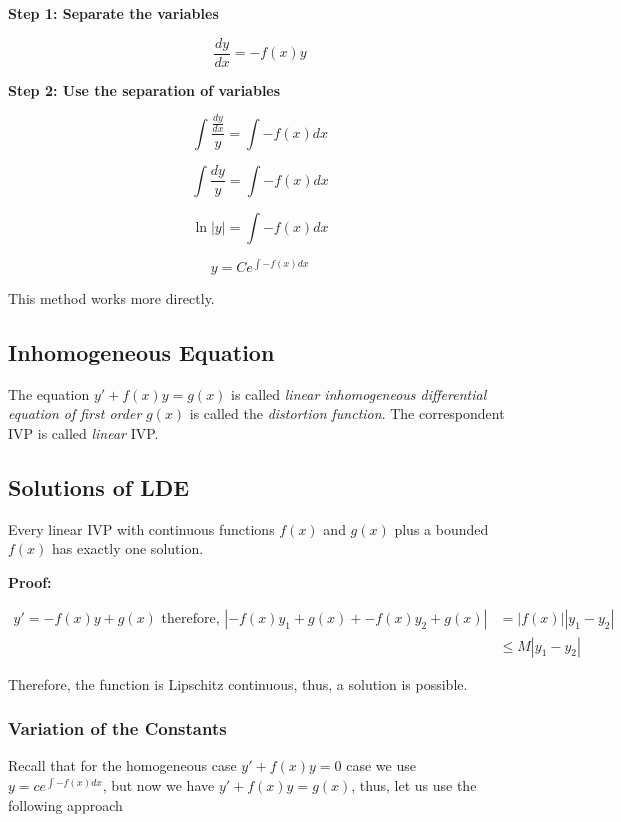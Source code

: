 \textbf{Step 1: Separate the variables}

\[
    \frac{dy}{dx} = -f(x)y
\]

\textbf{Step 2: Use the separation of variables}

\[
    \int \frac{\frac{dy}{dx}}{y} = \int -f(x) dx
\]

\[
    \int \frac{dy}{y} = \int -f(x) dx
\]

\[
    \ln|y| = \int -f(x) dx
\]

\[
    y = C e^{\int -f(x) dx}
\]

This method works more directly.

\subsection{Inhomogeneous Equation}

The equation \(y' + f(x)y = g(x)\) is called \emph{linear inhomogeneous differential equation 
of first order} \(g(x)\) is called the \emph{distortion function}. The correspondent IVP is called
\emph{linear} IVP\@.

\subsection{Solutions of LDE}

Every linear IVP with continuous functions \(f(x)\) and \(g(x)\) plus a bounded \(f(x)\) 
has exactly one solution.
\vspace{\baselineskip}

\textbf{Proof:}

\begin{align*}
    y' = -f(x)y + g(x) \text{ therefore, } |-f(x)y_1 + g(x) + -f(x)y_2 + g(x) | &= |f(x)||y_1 - y_2|\\
                                                                            &\le M |y_1 - y_2|
\end{align*}

Therefore, the function is Lipschitz continuous, thus, a solution is possible.
\QED

\subsubsection{Variation of the Constants}

Recall that for the homogeneous case \(y' + f(x)y = 0\) case we use 
\(y = c e^{\int -f(x) dx}\), but now we have \(y' + f(x)y = g(x)\), thus, let us use the following
approach

